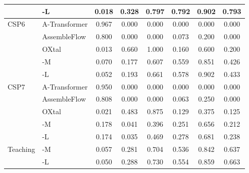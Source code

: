 \begin{table}[H]
\begin{tabular}{llcccccc}
\rowcolor{mfTealFill}
 & \model{}-L & 0.018 & 0.328 & 0.797 & 0.792 & 0.902 & 0.793 \\
\midrule
CSP6 & A-Transformer & 0.967 & 0.000 & 0.000 & 0.000 & 0.000 & 0.000 \\
 & AssembleFlow & 0.800 & 0.000 & 0.000 & 0.073 & 0.200 & 0.000 \\
 & OXtal & 0.013 & 0.660 & 1.000 & 0.160 & 0.600 & 0.200 \\
\rowcolor{mfTealFill}
 & \model{}-M & 0.070 & 0.177 & 0.607 & 0.559 & 0.851 & 0.426 \\
\rowcolor{mfTealFill}
 & \model{}-L & 0.052 & 0.193 & 0.661 & 0.578 & 0.902 & 0.433 \\
\midrule
CSP7 & A-Transformer & 0.950 & 0.000 & 0.000 & 0.000 & 0.000 & 0.000 \\
 & AssembleFlow & 0.808 & 0.000 & 0.000 & 0.063 & 0.250 & 0.000 \\
 & OXtal & 0.021 & 0.483 & 0.875 & 0.129 & 0.375 & 0.125 \\
\rowcolor{mfTealFill}
 & \model{}-M & 0.178 & 0.041 & 0.396 & 0.251 & 0.656 & 0.212 \\
\rowcolor{mfTealFill}
 & \model{}-L & 0.174 & 0.035 & 0.469 & 0.278 & 0.681 & 0.238 \\
\midrule
\rowcolor{mfTealFill}
Teaching & \model{}-M & 0.057 & 0.281 & 0.704 & 0.536 & 0.842 & 0.637 \\
\rowcolor{mfTealFill}
 & \model{}-L & 0.050 & 0.288 & 0.730 & 0.554 & 0.859 & 0.663 \\
\bottomrule
\end{tabular}
\end{table}
